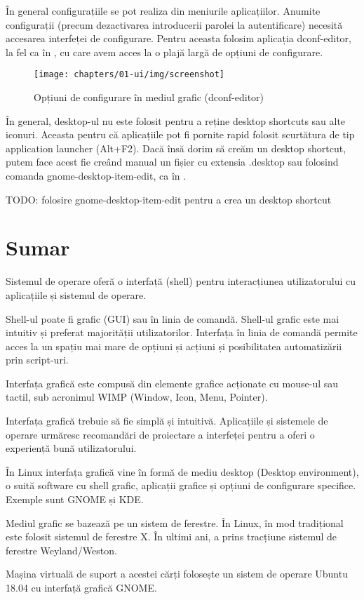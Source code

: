 În general configurațiile se pot realiza din meniurile aplicațiilor. Anumite configurații (precum dezactivarea introducerii parolei la autentificare) necesită accesarea interfeței de configurare. Pentru aceasta folosim aplicația dconf-editor, la fel ca în , cu care avem acces la o plajă largă de opțiuni de configurare.

\begin{figure}[!htbp]
  \centering
  \texttt{[image: chapters/01-ui/img/screenshot]}
  \caption{Opțiuni de configurare în mediul grafic (dconf-editor)}
  \label{fig:ui:dconf-editor}
\end{figure}

În general, desktop-ul nu este folosit pentru a reține desktop shortcuts sau alte iconuri. Aceasta pentru că aplicațiile pot fi pornite rapid folosit scurtătura de tip application launcher (Alt+F2). Dacă însă dorim să creăm un desktop shortcut, putem face acest fie creând manual un fișier cu extensia .desktop sau folosind comanda gnome-desktop-item-edit, ca în .

\begin{screen}[caption={Crearea unui desktop shortcut},label={lst:ui:desktop-create}]
TODO: folosire gnome-desktop-item-edit pentru a crea un desktop shortcut
\end{screen}

\section{Sumar}
\label{sec:ui:summary}

Sistemul de operare oferă o interfață (shell) pentru interacțiunea utilizatorului cu aplicațiile și sistemul de operare.

Shell-ul poate fi grafic (GUI) sau în linia de comandă. Shell-ul grafic este mai intuitiv și preferat majorității utilizatorilor. Interfața în linia de comandă permite acces la un spațiu mai mare de opțiuni și acțiuni și posibilitatea automatizării prin script-uri.

Interfața grafică este compusă din elemente grafice acționate cu mouse-ul sau tactil, sub acronimul WIMP (Window, Icon, Menu, Pointer).

Interfața grafică trebuie să fie simplă și intuitivă. Aplicațiile și sistemele de operare urmăresc recomandări de proiectare a interfeței pentru a oferi o experiență bună utilizatorului.

În Linux interfața grafică vine în formă de mediu desktop (Desktop environment), o suită software cu shell grafic, aplicații grafice și opțiuni de configurare specifice. Exemple sunt GNOME și KDE.

Mediul grafic se bazează pe un sistem de ferestre. În Linux, în mod tradițional este folosit sistemul de ferestre X. În ultimi ani, a prins tracțiune sistemul de ferestre Weyland/Weston.

Mașina virtuală de suport a acestei cărți folosește un sistem de operare Ubuntu 18.04 cu interfață grafică GNOME.
